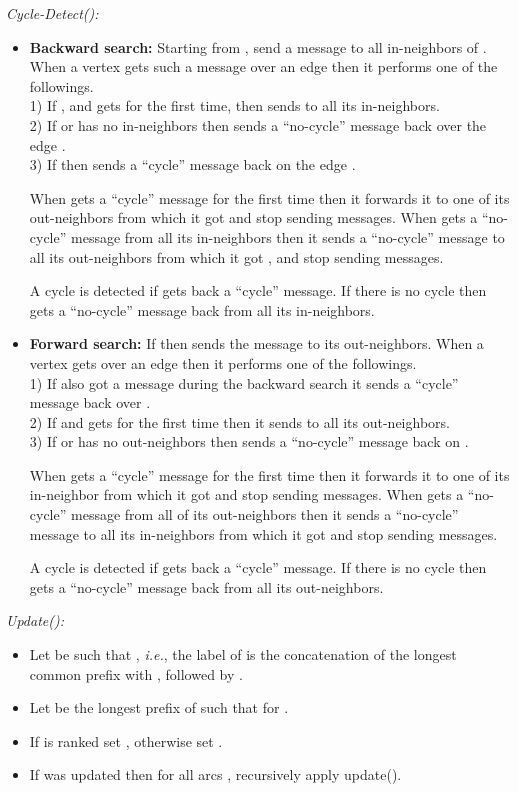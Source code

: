 \documentclass[11pt]{article}
\theoremstyle{plain}
\theoremstyle{definition}
\theoremstyle{remark}
\numberwithin{equation}{section}
\begin{document}
\emph{Cycle-Detect():}
\begin{itemize}
\item {\bf Backward search:} Starting from ,
send a message  to all in-neighbors of . When a vertex  gets such a
message  over an edge  then it performs one of the
followings.\\
1) If ,   and  gets  for the first time, then  sends   to all its in-neighbors. \\
2) If  or  has no in-neighbors then 
sends a ``no-cycle'' message back over the edge .\\
3) If  then  sends a ``cycle'' message back on the edge .


When  gets a ``cycle'' message  for the first time then it
forwards it to one of its out-neighbors from which it got  and
stop sending messages. When  gets a ``no-cycle'' message from all
 its in-neighbors then it sends a ``no-cycle'' message to all its
out-neighbors from which it got ,  and stop sending messages.

A cycle is detected if  gets back a ``cycle'' message. If there
is no cycle then  gets a ``no-cycle'' message back from all its
in-neighbors.

\smallskip

\item{\bf Forward search:}
 If  then  sends the message
  to its out-neighbors.
When a vertex  gets  over an edge  then it
performs one of the followings. \\
1) If  also got a message  during
 the backward search it sends a ``cycle'' message back over . \\
2) If    and  gets  for the first time
then it sends   to all its out-neighbors.\\
3) If  
 or  has no
out-neighbors then  sends a ``no-cycle'' message back on .

When  gets a ``cycle'' message  for the first time then it
forwards it to one of its in-neighbor from which it got 
and stop sending messages. When  gets a ``no-cycle'' message from
all of its out-neighbors then it sends a ``no-cycle'' message to all
its in-neighbors from which it got  and stop sending
messages.

A cycle is detected if  gets back a ``cycle'' message. If there
is no cycle then  gets a ``no-cycle'' message back from all its
out-neighbors.

\end{itemize}

\emph{Update():}
\begin{itemize}
\item Let  be such that  , {\sl i.e.}, the label of  is the concatenation of the longest common prefix with , followed by .
\item Let  be the longest prefix of  such that  for .
\item \label{alg:update} If  is ranked set , otherwise set .
\item\label{update:recurse} If  was updated then for all arcs , recursively apply update().
\end{itemize}
\end{document}
